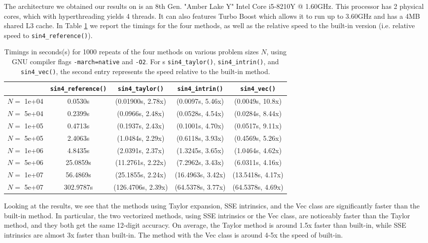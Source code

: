 \documentclass[10pt]{article}
\begin{document}
\begin{enumerate}
The architecture we obtained our results on is an 8th Gen. "Amber Lake Y" Intel Core i5-8210Y @ 1.60GHz. This processor has 2 physical cores, which with hyperthreading yields 4 threads. It can also features Turbo Boost which allows it to run up to 3.60GHz and has a 4MB shared L3 cache. In Table \ref{prob2-timings} we report the timings for the four methods, as well as the relative speed to the built-in version (i.e. relative speed to \texttt{sin4\_reference()}).
\begin{table}[!ht]
\centering
\caption{Timings in seconds(s) for 1000 repeats of the four methods on various problem sizes $N$, using GNU compiler flags \texttt{-march=native} and \texttt{-O2}. For s \texttt{sin4\_taylor()}, \texttt{sin4\_intrin()}, and \texttt{sin4\_vec()}, the second entry represents the speed relative to the built-in method.} \label{prob2-timings}
\begin{tabular}{| c | c | c | c | c |}
\hline
& \texttt{sin4\_reference()} & \texttt{sin4\_taylor()} & \texttt{sin4\_intrin()} & \texttt{sin4\_vec()}\\
\hline
$N =$	 1e+04 & 0.0530s & (0.01900s, 2.78x) & (0.0097s, 5.46x) & (0.0049s, 10.8x) \\
$N =$ 5e+04 & 0.2399s & (0.0966s, 2.48x) & (0.0528s, 4.54x) & (0.0284s, 8.44x) \\
$N =$ 1e+05 & 0.4713s & (0.1937s, 2.43x) & (0.1001s, 4.70x) & (0.0517s, 9.11x) \\
$N =$ 5e+05 & 2.4063s & (1.0484s, 2.29x) & (0.6118s, 3.93x) & (0.4569s, 5.26x) \\
$N =$ 1e+06 & 4.8435s & (2.0391s, 2.37x) & (1.3245s, 3.65x) & (1.0464s, 4.62x) \\
$N =$ 5e+06 & 25.0859s & (11.2761s, 2.22x) & (7.2962s, 3.43x) & (6.0311s, 4.16x) \\
$N =$ 1e+07 & 56.4869s & (25.1855s, 2.24x) & (16.4963s, 3.42x) & (13.5418s, 4.17x) \\
$N =$ 5e+07 & 302.9787s & (126.4706s, 2.39x) & (64.5378s, 3.77x) & (64.5378s, 4.69x) \\
\hline
\end{tabular}
\end{table}

Looking at the results, we see that the methods using Taylor expansion, SSE intrinsics, and the Vec class are significantly faster than the built-in method. In particular, the two vectorized methods, using SSE intrinsics or the Vec class, are noticeably faster than the Taylor method, and they both get the same 12-digit accuracy. On average, the Taylor method is around 1.5x faster than built-in, while SSE intrinsics are almost 3x faster than built-in. The method with the Vec class is around 4-5x the speed of built-in.


\end{enumerate}
\end{document}
